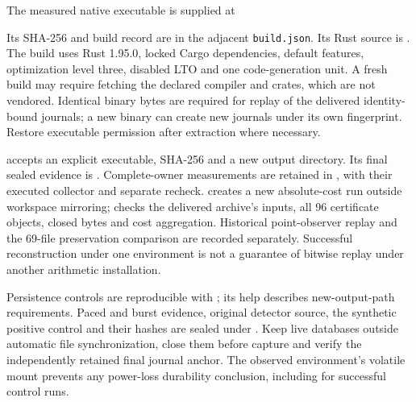 \documentclass[11pt,a4paper]{article}
\theoremstyle{definition}\newtheorem{definition}[theorem]{Definition}
\begin{document}
The measured native executable is supplied at
\begin{quote}\raggedright\footnotesize
{}
\end{quote}
Its SHA-256 and build record are in the adjacent \texttt{build.json}. Its Rust source is . The build uses Rust 1.95.0, locked Cargo dependencies, default features, optimization level three, disabled LTO and one code-generation unit. A fresh build may require fetching the declared compiler and crates, which are not vendored. Identical binary bytes are required for replay of the delivered identity-bound journals; a new binary can create new journals under its own fingerprint. Restore executable permission after extraction where necessary.

 accepts an explicit executable, SHA-256 and a new output directory. Its final sealed evidence is . Complete-owner measurements are retained in , with their executed collector and separate recheck.  creates a new absolute-cost run outside workspace mirroring;  checks the delivered archive's inputs, all 96 certificate objects, closed bytes and cost aggregation. Historical point-observer replay and the 69-file preservation comparison are recorded separately. Successful reconstruction under one environment is not a guarantee of bitwise replay under another arithmetic installation.

Persistence controls are reproducible with ; its help describes new-output-path requirements. Paced and burst evidence, original detector source, the synthetic positive control and their hashes are sealed under . Keep live databases outside automatic file synchronization, close them before capture and verify the independently retained final journal anchor. The observed environment's volatile mount prevents any power-loss durability conclusion, including for successful control runs.
\end{document}
